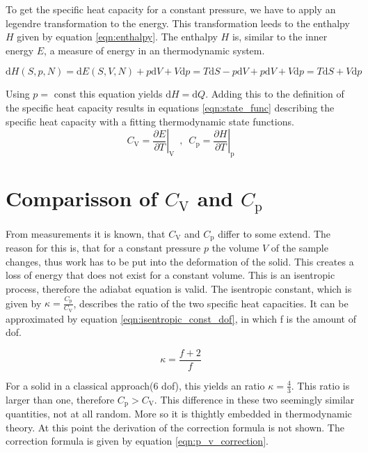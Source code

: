 To get the specific heat capacity for a constant pressure, we have to apply an legendre transformation to the energy. This transformation leeds to the enthalpy $H$ given by equation \ref{eqn:enthalpy}.
The enthalpy $H$ is, similar to the inner energy $E$, a measure of energy in an thermodynamic system.

\begin{equation}
    \label{eqn:enthalpy}
    \mathrm{d}H(S,p,N) = \mathrm{d}E(S,V,N) + p\mathrm{d}V + V\mathrm{d}p = T\mathrm{d}S - p\mathrm{d}V + p\mathrm{d}V + V\mathrm{d}p = T\mathrm{d}S + V\mathrm{d}p
\end{equation}

Using $p =$ const this equation yields $\mathrm{d}H = \mathrm{d}Q$. Adding this to the definition of the specific heat capacity results in equations \ref{eqn:state_func} describing the specific 
heat capacity with a fitting thermodynamic state functions.
\begin{equation}
    \label{eqn:state_func}
    C_\mathrm{V} = \left.\frac{\partial E}{\partial T} \right\vert_\mathrm{V} \,\,\,,\,\,\, C_\mathrm{p} = \left.\frac{\partial H}{\partial T} \right\vert_\mathrm{p}
\end{equation}

\section{Comparisson of $C_\mathrm{V}$ and $C_\mathrm{p}$}
From measurements it is known, that $C_\mathrm{V}$ and $C_\mathrm{p}$ differ to some extend. The reason for this is, that for a constant pressure $p$ the volume $V$ of the sample 
changes, thus work has to be put into the deformation of the solid. This creates a loss of energy that does not exist for a constant volume. This is an isentropic process, therefore 
the adiabat equation is valid. The isentropic constant, which is given by $\kappa = \frac{C_\mathrm{p}}{C_\mathrm{V}}$, describes the ratio of the two specific heat capacities. It can 
be approximated by equation \ref{eqn:isentropic_const_dof}, in which f is the amount of dof. 

\begin{equation}
    \label{eqn:isentropic_const_dof}
    \kappa = \frac{f+2}{f}
\end{equation}

For a solid in a classical approach(6 dof), this yields an ratio $\kappa = \frac{4}{3}$. This ratio is larger than one, therefore $C_\mathrm{p} > C_\mathrm{V}$.
This difference in these two seemingly similar quantities, not at all random. More so it is thightly embedded in thermodynamic theory. At this point the derivation of the correction 
formula is not shown. The correction formula is given by equation \ref{eqn:p_v_correction}.

